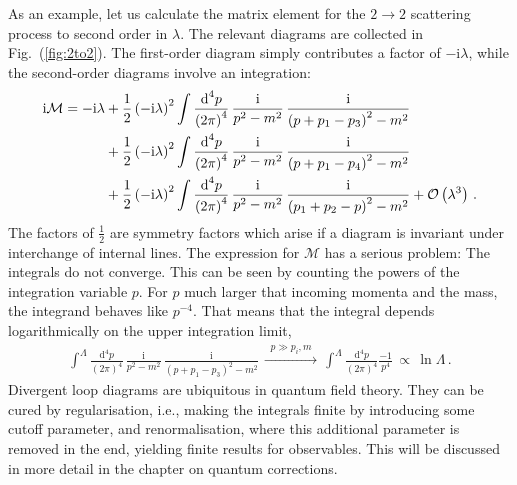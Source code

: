 \documentclass[12pt]{report}
\renewcommand{\d}{\text{d}}
\renewcommand{\i}{\ensuremath{\text{i}}}
\newcommand{\2}{\ensuremath{\sqrt{2}\,}}
\renewcommand{\d}{\ensuremath{\text{d}}}
\begin{document}
{        As an example, let us calculate the matrix element for the $2\to2$ scattering process to
        second order in $\lambda$. 
        The relevant diagrams are collected in Fig.~(\ref{fig:2to2}). The first-order
        diagram simply contributes a factor of $-\i\lambda$, while the second-order diagrams involve an
        integration:
        \begin{align}
          \begin{split}
            \i \mathcal{M} &= -\i\lambda +\frac{1}{2}\left(-\i\lambda\right)^2\int \frac{\d^4
              p}{\left(2\pi\right)^4} \, \frac{\i}{p^2-m^2}\, \frac{\i}{\left(p+p_1
                -p_3\right)^2-m^2}\\
            &\quad\mspace{35.5mu}+\frac{1}{2}\left(-\i\lambda\right)^2\int \frac{\d^4
              p}{\left(2\pi\right)^4} \, \frac{\i}{p^2-m^2}\, \frac{\i}{\left(p+p_1 
                -p_4\right)^2-m^2}\\
            &\quad\mspace{35.5mu}+\frac{1}{2}\left(-\i\lambda\right)^2\int \frac{\d^4
              p}{\left(2\pi\right)^4} \, 
            \frac{\i}{p^2-m^2}\, \frac{\i}{\left(p_1+p_2 -p\right)^2 -m^2} + 
             \mathcal{O}\left(\lambda^3\right)\,.
          \end{split}
        \end{align}
        The factors of $\frac{1}{2}$ are symmetry factors which arise if a diagram is invariant
        under interchange of internal lines. The expression for $\mathcal{M}$ has a serious problem:
        The integrals do not converge. This can be seen by counting the powers of the integration
        variable $p$. For $p$ much larger that incoming momenta and the mass, the integrand behaves
        like $p^{-4}$. That means that the integral depends logarithmically on the upper integration
        limit,  
        \begin{align}
          \int^\Lambda \frac{\d^4 p}{\left(2\pi\right)^4} \, \frac{\i}{p^2-m^2}\, \frac{\i}{\left(p+p_1
              -p_3\right)^2-m^2}\,  \xrightarrow{\mspace{10mu} \displaystyle p\gg p_i,m
            \mspace{10mu}} \, 
          \int^\Lambda \frac{\d^4 p}{\left(2\pi\right)^4} \frac{-1}{p^4} \, \propto \, \ln \Lambda\,.
        \end{align}
        Divergent loop diagrams are ubiquitous in quantum field theory. They
        can be cured by regularisation, i.e., making the integrals finite by introducing some cutoff
        parameter, and renormalisation, where this additional parameter is removed
        in the end, yielding finite results for observables. This will be discussed in more detail 
        in the chapter on quantum corrections. 


}
\end{document}
